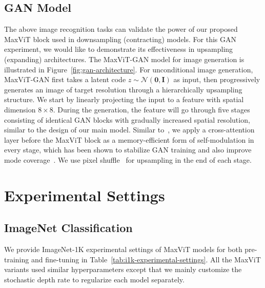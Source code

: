 \documentclass[runningheads]{llncs}
\begin{document}
\subsection{GAN Model}
\label{ssec:gan-model}
The above image recognition tasks can validate the power of our proposed MaxViT block used in downsampling (contracting) models.
For this GAN experiment, we would like to demonstrate its effectiveness in upsampling (expanding) architectures.
The MaxViT-GAN model for image generation is illustrated in Figure~\ref{fig:gan-architecture}.
For unconditional image generation, MaxViT-GAN first takes a latent code $z\sim \mathcal{N}(\mathbf{0},\mathbf{I})$ as input, then progressively generates an image of target resolution through a hierarchically upsampling structure. We start by linearly projecting the input to a feature with spatial dimension $8\times 8$. During the generation, the feature will go through five stages consisting of identical GAN blocks with gradually increased spatial resolution, similar to the design of our main model. Similar to~\cite{zhao2021improved}, we apply a cross-attention layer before the MaxViT block as a memory-efficient form of self-modulation in every stage, which has been shown to stabilize GAN training and also improve mode coverage~\cite{chen2018self,zhao2021improved}. We use pixel shuffle~\cite{shi2016real} for upsampling in the end of each stage.



\section{Experimental Settings}
\label{sec:experimental-settings}

\subsection{ImageNet Classification}
\label{ssec:imagenet-settings}

We provide ImageNet-1K experimental settings of MaxViT models for both pre-training and fine-tuning in Table~\ref{tab:i1k-experimental-settings}. All the MaxViT variants used similar hyperparameters except that we mainly customize the stochastic depth rate to regularize each model separately.
\end{document}
